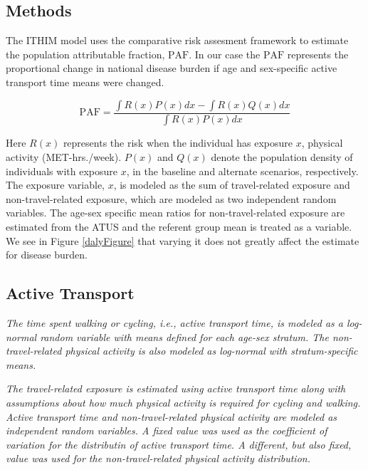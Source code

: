 \documentclass{bioinfo}
\newcommand{\af}{\textrm{PAF}}
\newcommand{\mets}{MET-hrs./week}
\begin{document}
\begin{methods}

\section{Methods}

The ITHIM model uses the comparative risk assesment framework to
estimate the population attributable fraction, $\af$.  In our case the
$\af$ represents the proportional change in national disease burden if
age and sex-specific active transport time means were changed.

\begin{equation}
\af = \frac{\int R(x)P(x) dx  - \int R(x)Q(x) dx }{\int R(x)P(x) dx}
\end{equation}

Here $R(x)$ represents the risk when the individual has exposure $x$,
physical activity (\mets).  $P(x)$ and $Q(x)$ denote the population
density of individuals with exposure $x$, in the baseline and
alternate scenarios, respectively.  The exposure variable, $x$, is
modeled as the sum of travel-related exposure and non-travel-related
exposure, which are modeled as two independent random variables.  The
age-sex specific mean ratios for non-travel-related exposure are
estimated from the ATUS \cite{ATUS} and the referent group mean is
treated as a variable.  We see in Figure \ref{dalyFigure} that varying
it does not greatly affect the estimate for disease burden.

\subsection{Active Transport}

\textit{The time spent walking or cycling, i.e., active transport
  time, is modeled as a log-normal random variable with means defined
  for each age-sex stratum.  The non-travel-related physical activity
  is also modeled as log-normal with stratum-specific means.}

\textit{ The travel-related exposure is estimated using active
  transport time along with assumptions about how much physical
  activity is required for cycling and walking.  Active transport time
  and non-travel-related physical activity are modeled as independent
  random variables.  A fixed value was used as the coefficient of
  variation for the distributin of active transport time. A different,
  but also fixed, value was used for the non-travel-related physical
  activity distribution.}


\end{methods}
\end{document}
